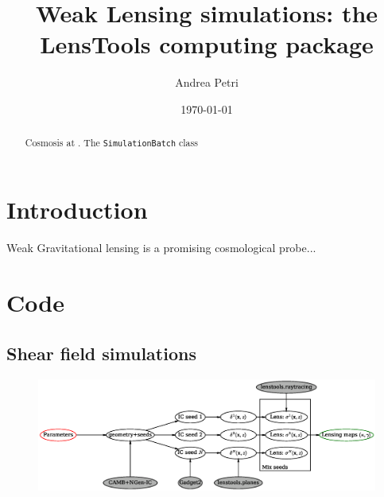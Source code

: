 \documentclass[reprint,aps,prd,superscriptaddress,showkeys,showpacs]{revtex4-1}
\begin{document}
\title{Weak Lensing simulations: the LensTools computing package}

\author{Andrea Petri}

\date{\today}

\label{firstpage}

\begin{abstract}
Cosmosis at \citep{cosmosis}. The \texttt{SimulationBatch} class
    
\end{abstract}



\maketitle



\section{Introduction}
%
Weak Gravitational lensing is a promising cosmological probe...  


\section{Code} 

\subsection{Shear field simulations}

\begin{figure}
\includegraphics[scale=0.6]{Figures/flow.eps}
\end{figure}
\end{document}
